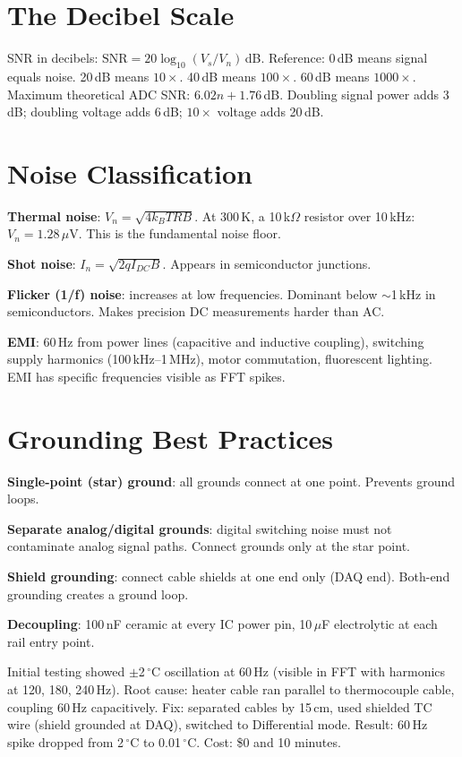 \documentclass[11pt,letterpaper,twoside,openany]{book}
\newcommand{\degC}{\ensuremath{{}^{\circ}\text{C}}}
\begin{document}
\section{The Decibel Scale}
SNR in decibels: $\text{SNR} = 20\log_{10}(V_s/V_n)$\,dB. Reference: 0\,dB means signal equals noise. 20\,dB means $10\times$. 40\,dB means $100\times$. 60\,dB means $1000\times$. Maximum theoretical ADC SNR: $6.02n + 1.76$\,dB. Doubling signal power adds 3\,dB; doubling voltage adds 6\,dB; $10\times$ voltage adds 20\,dB.

\section{Noise Classification}
\textbf{Thermal noise}: $V_n = \sqrt{4k_BTR B}$. At 300\,K, a 10\,k$\Omega$ resistor over 10\,kHz: $V_n = 1.28$\,$\mu$V. This is the fundamental noise floor.

\textbf{Shot noise}: $I_n = \sqrt{2qI_{DC}B}$. Appears in semiconductor junctions.

\textbf{Flicker (1/f) noise}: increases at low frequencies. Dominant below $\sim$1\,kHz in semiconductors. Makes precision DC measurements harder than AC.

\textbf{EMI}: 60\,Hz from power lines (capacitive and inductive coupling), switching supply harmonics (100\,kHz--1\,MHz), motor commutation, fluorescent lighting. EMI has specific frequencies visible as FFT spikes.

\section{Grounding Best Practices}
\textbf{Single-point (star) ground}: all grounds connect at one point. Prevents ground loops.

\textbf{Separate analog/digital grounds}: digital switching noise must not contaminate analog signal paths. Connect grounds only at the star point.

\textbf{Shield grounding}: connect cable shields at one end only (DAQ end). Both-end grounding creates a ground loop.

\textbf{Decoupling}: 100\,nF ceramic at every IC power pin, 10\,$\mu$F electrolytic at each rail entry point.

\begin{examplebox}
Initial testing showed $\pm$2\,\degC{} oscillation at 60\,Hz (visible in FFT with harmonics at 120, 180, 240\,Hz). Root cause: heater cable ran parallel to thermocouple cable, coupling 60\,Hz capacitively. Fix: separated cables by 15\,cm, used shielded TC wire (shield grounded at DAQ), switched to Differential mode. Result: 60\,Hz spike dropped from 2\,\degC{} to 0.01\,\degC{}. Cost: \$0 and 10 minutes.
\end{examplebox}
\end{document}
